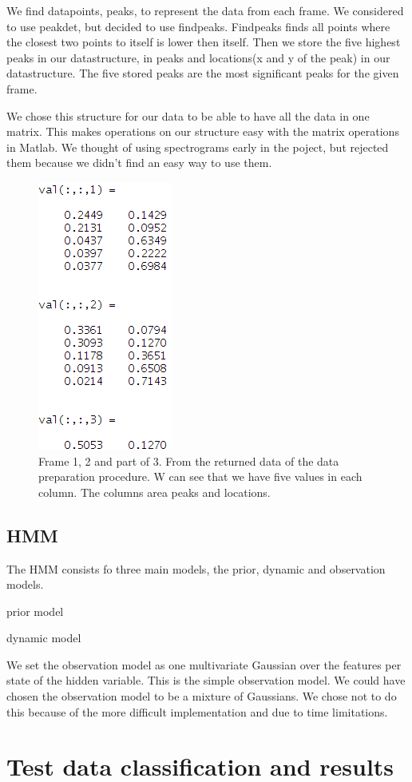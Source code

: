 \documentclass[titlepage]{article}
\begin{document}
We find datapoints, peaks, to represent the data from each frame. We considered to use peakdet, but decided to use findpeaks. Findpeaks finds all points where the closest two points to itself is lower then itself. Then we store the five highest peaks in our datastructure, in peaks and locations(x and y of the peak) in our datastructure. The five stored peaks are the most significant peaks for the given frame. 

We chose this structure for our data to be able to have all the data in one matrix. This makes operations on our structure easy with the matrix operations in Matlab. We thought of using spectrograms early in the poject, but rejected them because we didn't find an easy way to use them. 

\begin{figure}[Data Structure]
  \centering
    \includegraphics[height=60mm\textwidth]{data_part1}
  \caption{Frame 1, 2 and part of 3. From the returned data of the data preparation procedure. W can see that we have five values in each column. The columns area peaks and locations.}
\end{figure}

    \subsection{HMM}
The HMM consists fo three main models, the prior, dynamic and observation models. 

prior model

dynamic model 
  
We set the observation model as one multivariate Gaussian over the features per state of the hidden variable. This is the simple observation model. We could have chosen the observation model to be a mixture of Gaussians. We chose not to do this because of the more difficult implementation and due to time limitations.

\section{Test data classification and results}
\end{document}
